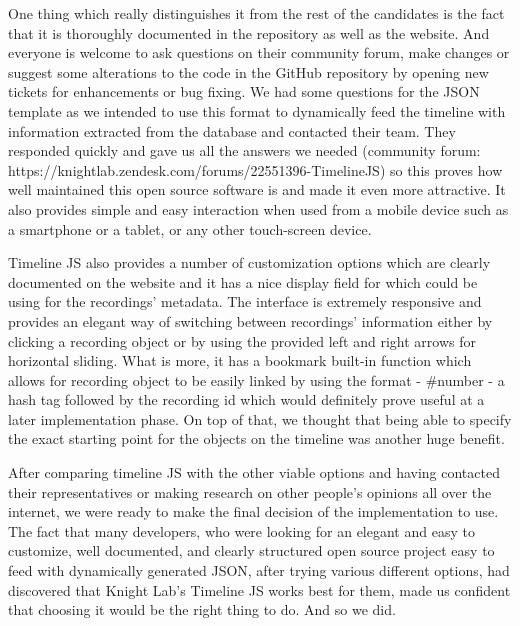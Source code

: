 \documentclass{l3proj}
\begin{document}
One thing which really distinguishes it from the rest of the candidates is the fact that it is thoroughly documented in the repository as well as the website. And everyone is welcome to ask questions on their community forum, make changes or suggest some alterations to the code in the GitHub repository by opening new tickets for enhancements or bug fixing. We had some questions for the JSON template as we intended to use this format to dynamically feed the timeline with information extracted from the database and contacted their team. They responded quickly and gave us all the answers we needed (community forum: https://knightlab.zendesk.com/forums/22551396-TimelineJS) so this proves how well maintained this open source software is and made it even more attractive. It also provides simple and easy interaction when used from a mobile device such as a smartphone or a tablet, or any other touch-screen device.

Timeline JS also provides a number of customization options which are clearly documented on the website and it has a nice display field for which could be using for the recordings' metadata. The interface is extremely responsive and provides an elegant way of switching between recordings' information either by clicking a recording object or by using the provided left and right arrows for horizontal sliding. What is more, it has a bookmark built-in function which allows for recording object to be easily linked by using the format - #number - a hash tag followed by the recording id which would definitely prove useful at a later implementation phase. On top of that, we thought that being able to specify the exact starting point for the objects on the timeline was another huge benefit.

After comparing timeline JS with the other viable options and having contacted their representatives or making research on other people's opinions all over the internet, we were ready to make the final decision of the implementation to use. The fact that many developers, who were looking for an elegant and easy to customize, well documented, and clearly structured open source project easy to feed with dynamically generated JSON, after trying various different options, had discovered that Knight Lab’s Timeline JS works best for them, made us confident that choosing it would be the right thing to do. And so we did.
\end{document}

